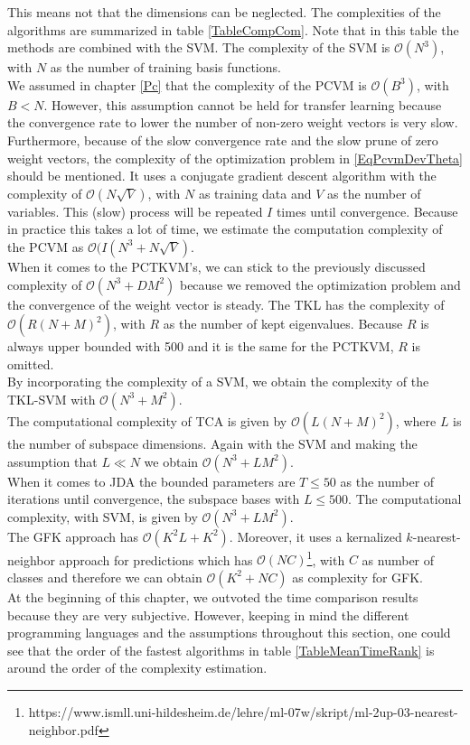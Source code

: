 This means not that the dimensions can be neglected.
The complexities of the algorithms are summarized in table \ref{TableCompCom}.
Note that in this table the methods are combined with the \acs{SVM}.
The complexity of the \acs{SVM} is $\mathcal{O}(N^3)$, with $N$ as the number of training basis functions.\\
We assumed in chapter \ref{Pc} that the complexity of the \acs{PCVM} is $\mathcal{O}(B^3)$, with $B < N$.
However, this assumption cannot be held for transfer learning because the convergence rate to lower the number of non-zero weight vectors is very slow.
Furthermore, because of the slow convergence rate and the slow prune of zero weight vectors, the complexity of the optimization problem in \ref{EqPcvmDevTheta} should be mentioned.
It uses a conjugate gradient descent algorithm with the complexity of $\mathcal{O}(N\sqrt{V})$, with $N$ as training data and $V$ as the number of variables.\cite[p. 37-38]{Shewchuk.1994}
This (slow) process will be repeated $I$ times until convergence. Because in practice this takes a lot of time, we estimate the computation complexity of the \acs{PCVM} as $\mathcal{O}(I(N^3+N\sqrt{V})$.\\
When it comes to the \acs{PCTKVM}'s, we can stick to the previously discussed complexity of $\mathcal{O}(N^3+DM^2)$ because we removed the optimization problem and the convergence of the weight vector is steady. 
The \acs{TKL} has the complexity of $\mathcal{O}(R(N+M)^2)$, with $R$ as the number of kept eigenvalues.
Because $R$ is always upper bounded with 500 and it is the same for the \acs{PCTKVM}, $R$ is omitted.\\
By incorporating the complexity of a \acs{SVM}, we obtain the complexity of the \acs{TKL}-\acs{SVM} with $\mathcal{O}(N^3+M^2)$.\\
The computational complexity of \acs{TCA} is given by $\mathcal{O}(L(N+M)^2)$, where $L$ is the number of subspace dimensions.
Again with the \acs{SVM} and making the assumption that $L \ll N$ we obtain $\mathcal{O}(N^3+LM^2)$.\\
When it comes to \acs{JDA} the bounded parameters are $T \le 50$ as the number of iterations until convergence, the subspace bases with $L\le 500$.
The computational complexity, with \acs{SVM}, is given by $\mathcal{O}(N^3+LM^2)$.\\
The \acs{GFK} approach has $\mathcal{O}(K^2L+K^2)$.
Moreover, it uses a kernalized $k$-nearest-neighbor approach for predictions which has $\mathcal{O}(NC)$\footnote{https://www.ismll.uni-hildesheim.de/lehre/ml-07w/skript/ml-2up-03-nearest-neighbor.pdf}, with $C$ as number of classes and therefore we can obtain $\mathcal{O}(K^2+NC)$ as complexity for \acs{GFK}.\\
At the beginning of this chapter, we outvoted the time comparison results because they are very subjective.
However, keeping in mind the different programming languages and the assumptions throughout this section, one could see that the order of the fastest algorithms in table \ref{TableMeanTimeRank} is around the order of the complexity estimation.

